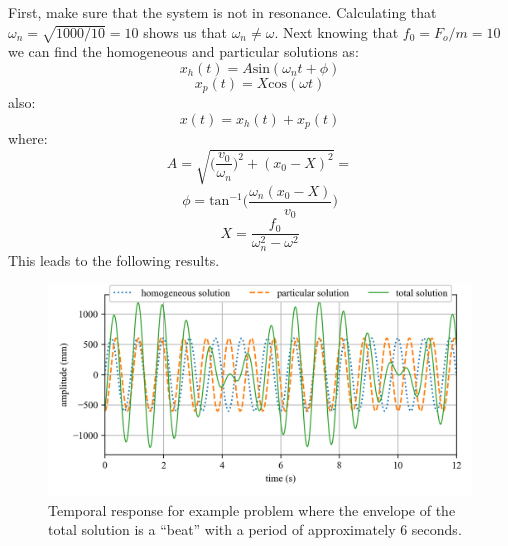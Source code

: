\documentclass[12pt,letter]{article}
\begin{document}
\begin{example}
	\noindent First, make sure that the system is not in resonance. Calculating that $\omega_n = \sqrt{1000/10} = 10$ shows us that $\omega_n \neq \omega$. Next knowing that $f_0 = F_o/m = 10$ we can find the homogeneous and particular solutions as:
	\begin{equation}
		x_h(t) = A\text{sin}(\omega_n t + \phi)
	\end{equation}				
	\begin{equation}
		x_p(t) = X\text{cos}(\omega t) 
	\end{equation}	
	also:			
	\begin{equation}
		x(t) = x_h(t) + x_p(t)
	\end{equation}	
	where:			
	\begin{equation}
		A = \sqrt{\bigg(\frac{v_0}{\omega_n}\bigg)^2+(x_0-X)^2} = 
	\end{equation}				
	\begin{equation}
		\phi = \text{tan}^{-1}\bigg(\frac{\omega_n(x_0-X)}{v_0}\bigg)
	\end{equation}				
	\begin{equation}
		X = \frac{f_0}{\omega_n^2-\omega^2}
	\end{equation}			
	This leads to the following results. 
	\begin{figure}[H]
		\centering
		\includegraphics[]{../figures/homogeneous_and_particular_solutions.png}
		\caption{Temporal response for example problem where the envelope of the total solution is a ``beat'' with a period of approximately 6 seconds.}
	\end{figure}			

\end{example}
\end{document}
